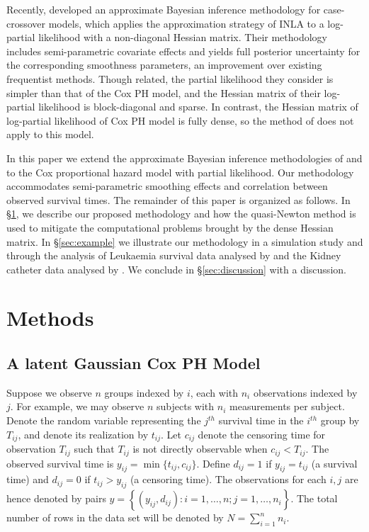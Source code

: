 \documentclass[ba]{imsart}
\begin{document}
Recently, \cite{casecross} developed an approximate Bayesian inference methodology for case-crossover models, which applies the approximation strategy of INLA to a log-partial likelihood with a non-diagonal Hessian matrix. Their methodology includes semi-parametric covariate effects and yields full posterior uncertainty for the corresponding smoothness parameters, an improvement over existing frequentist methods. Though related, the partial likelihood they consider is simpler than that of the Cox PH model, and the Hessian matrix of their log-partial likelihood is block-diagonal and sparse. In contrast, the Hessian matrix of log-partial likelihood of Cox PH model is fully dense, so the method of \cite{casecross} does not apply to this model.

In this paper we extend the approximate Bayesian inference methodologies of \cite{casecross} and \cite{inlacoxph} to the Cox proportional hazard model with partial likelihood. Our methodology accommodates semi-parametric smoothing effects and correlation between observed survival times. The remainder of this paper is organized as follows. In \S\ref{sec:method}, we describe our proposed methodology and how the quasi-Newton method is used to mitigate the computational problems brought by the dense Hessian matrix. In \S\ref{sec:example} we illustrate our methodology in a simulation study and through the analysis of Leukaemia survival data analysed by \cite{inlacoxph} and the Kidney catheter data analysed by \cite{kidney}. We conclude in \S\ref{sec:discussion} with a discussion.

\section{Methods}\label{sec:method}

\subsection{A latent Gaussian Cox PH Model}

Suppose we observe $n$ groups indexed by $i$, each with $n_{i}$ observations indexed by $j$. For example, we may observe $n$ subjects with $n_{i}$ measurements per subject. Denote the random variable representing the $j^{th}$ survival time in the $i^{th}$ group by $T_{ij}$, and denote its realization by $t_{ij}$. Let $c_{ij}$ denote the censoring time for observation $T_{ij}$ such that $T_{ij}$ is not directly observable when $c_{ij} < T_{ij}$. The observed survival time is $y_{ij} = \min\{t_{ij},c_{ij}\}$. Define $d_{ij} = 1$ if $y_{ij} = t_{ij}$ (a survival time) and $d_{ij} = 0$ if $t_{ij} > y_{ij}$ (a censoring time). The observations for each $i,j$ are hence denoted by pairs $y =  \left\{(y_{ij},d_{ij}): i = 1,\ldots,n; j = 1,\ldots,n_{i} \right\}$. The total number of rows in the data set will be denoted by $N = \sum_{i=1}^{n}n_{i}$.
\end{document}

